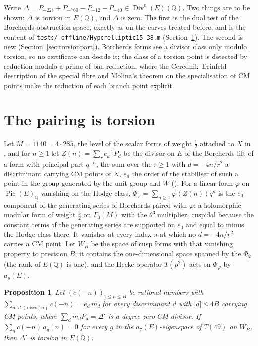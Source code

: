 \documentclass[11pt,reqno]{amsart}
\theoremstyle{plain}
\newtheorem{proposition}[theorem]{Proposition}
\theoremstyle{definition}
\DeclareMathOperator{\Pic}{Pic}
\DeclareMathOperator{\Div}{Div}
\newcommand{\Q}{\mathbb{Q}}
\begin{document}
Write $\Delta=P_{-228}+P_{-760}-P_{-12}-P_{-40}\in\Div^0(E)(\Q)$. Two things are to be shown: $\Delta$ is
torsion in $E(\Q)$, and $\Delta$ is zero. The first is the dual test of the Borcherds obstruction space,
exactly as on the curves treated before, and is the content of \texttt{tests/\_offline/Hyperelliptic15\_38.m}
(Section~\ref{sec:torsion}). The second is new (Section~\ref{sec:torsionpart}). Borcherds forms see a divisor
class only modulo torsion, so no certificate can decide it; the class of a torsion point is detected by
reduction modulo a prime of bad reduction, where the Cerednik--Drinfeld description of the special fibre
and Molina's theorem on the specialisation of CM points make the reduction of each branch point explicit.

\section{The pairing is torsion}\label{sec:torsion}

Let $M=1140=4\cdot 285$, the level of the scalar forms of weight $\tfrac12$ attached to $X$ in
\cite[Lemmas 10, 22, 25]{gy}, and for $n\ge1$ let $Z(n)=\sum_r e_d^{-1}P_d$ be the divisor on $E$ of the
Borcherds lift of a form with principal part $q^{-n}$, the sum over the $r\ge1$ with $d=-4n/r^2$ a
discriminant carrying CM points of $X$, $e_d$ the order of the stabiliser of such a point in the group
generated by the unit group and $W$ (\cite[Lemma 25]{gy}). For a linear form $\varphi$ on $\Pic(E)_\Q$
vanishing on the Hodge class, $\Phi_\varphi=\sum_{n\ge1}\varphi(Z(n))q^n$ is the $e_0$-component of the
generating series of Borcherds \cite[Theorem 4.5]{borcherds} paired with $\varphi$: a holomorphic modular
form of weight $\tfrac32$ on $\Gamma_0(M)$ with the $\theta^3$ multiplier, cuspidal because the constant
terms of the generating series are supported on $e_0$ and equal to minus the Hodge class there. It vanishes
at every index $n$ at which no $d=-4n/r^2$ carries a CM point. Let $W_B$ be the space of cusp forms with that
vanishing property to precision $B$; it contains the one-dimensional space spanned by the $\Phi_\varphi$
(the rank of $E(\Q)$ is one), and the Hecke operator $T(p^2)$ acts on $\Phi_\varphi$ by $a_p(E)$.

\begin{proposition}\label{prop:dual}
Let $(c(-n))_{1\le n\le B}$ be rational numbers with $\sum_{n:\,d\in\mathrm{discs}(n)}c(-n)=e_d\,m_d$ for every
discriminant $d$ with $|d|\le 4B$ carrying CM points, where $\sum_d m_dP_d=\Delta'$ is a degree-zero CM
divisor. If $\sum_n c(-n)\,a_g(n)=0$ for every $g$ in the $a_7(E)$-eigenspace of $T(49)$ on $W_B$, then
$\Delta'$ is torsion in $E(\Q)$.
\end{proposition}
\end{document}
